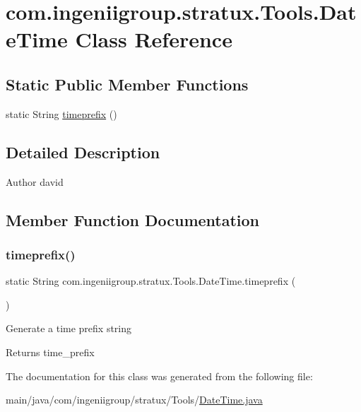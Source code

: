 \hypertarget{classcom_1_1ingeniigroup_1_1stratux_1_1_tools_1_1_date_time}{}\section{com.\+ingeniigroup.\+stratux.\+Tools.\+Date\+Time Class Reference}
\label{classcom_1_1ingeniigroup_1_1stratux_1_1_tools_1_1_date_time}
\subsection*{Static Public Member Functions}
\begin{DoxyCompactItemize}
\item 
static String \hyperlink{classcom_1_1ingeniigroup_1_1stratux_1_1_tools_1_1_date_time_aab1b39660b0b4b101f1ffaa62647e389}{timeprefix} ()
\end{DoxyCompactItemize}


\subsection{Detailed Description}
\begin{DoxyAuthor}{Author}
david 
\end{DoxyAuthor}


\subsection{Member Function Documentation}
\mbox{\label{classcom_1_1ingeniigroup_1_1stratux_1_1_tools_1_1_date_time_aab1b39660b0b4b101f1ffaa62647e389}} 
\subsubsection{\texorpdfstring{timeprefix()}{timeprefix()}}
{\footnotesize\ttfamily static String com.\+ingeniigroup.\+stratux.\+Tools.\+Date\+Time.\+timeprefix (\begin{DoxyParamCaption}{ }\end{DoxyParamCaption})\hspace{0.3cm}{\ttfamily [static]}}

Generate a time prefix string

\begin{DoxyReturn}{Returns}
time\+\_\+prefix 
\end{DoxyReturn}


The documentation for this class was generated from the following file\+:\begin{DoxyCompactItemize}
\item 
main/java/com/ingeniigroup/stratux/\+Tools/\hyperlink{_date_time_8java}{Date\+Time.\+java}\end{DoxyCompactItemize}
